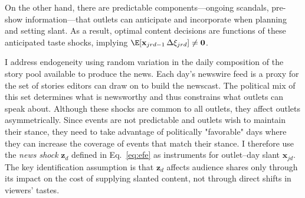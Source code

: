 \documentclass[12pt]{article}
\begin{document}
	
On the other hand, there are predictable components—ongoing scandals, pre-show information—that outlets can anticipate and incorporate when planning and setting slant. As a result,  optimal content decisions are functions of these anticipated taste shocks, implying $\E[\mathbf{x}_{jrd-1}\,\Delta\xi_{jrd}] \neq \mathbf{0}$.
	


	
	
	I address endogeneity using random variation in the daily composition of the story pool available to produce the news. Each day’s newswire feed is a proxy for the set of stories editors can draw on to build the newscast. The political mix of this set determines what is newsworthy and thus constrains what outlets can speak about. Although these shocks are common to all outlets, they affect outlets asymmetrically. Since events are not predictable and outlets wish to maintain their stance, they need to take advantage of politically "favorable" days where they can increase the coverage of events that match their stance. I therefore use the \emph{news shock} $\mathbf{z}_d$ defined in Eq.~\eqref{eq:efe} as instruments for outlet–day slant $\mathbf{x}_{jd}$. The key identification assumption is that $\mathbf{z}_d$ affects audience shares only through its impact on the cost of supplying slanted content, not through direct shifts in viewers’ tastes.
	
	
	
	
	
	
\end{document}
